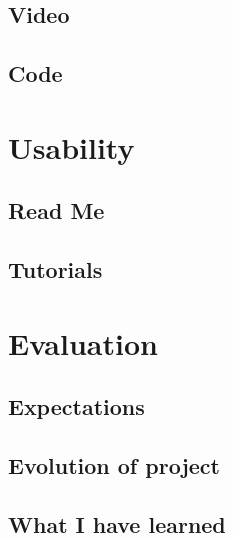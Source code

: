 \documentclass[a4paper]{report}
\begin{document}
\subsection{Video}
\subsection{Code}

\section{Usability}
\subsection{Read Me}
\subsection{Tutorials}

\section{Evaluation}
\subsection{Expectations}
\subsection{Evolution of project}
\subsection{What I have learned}




\end{document}
